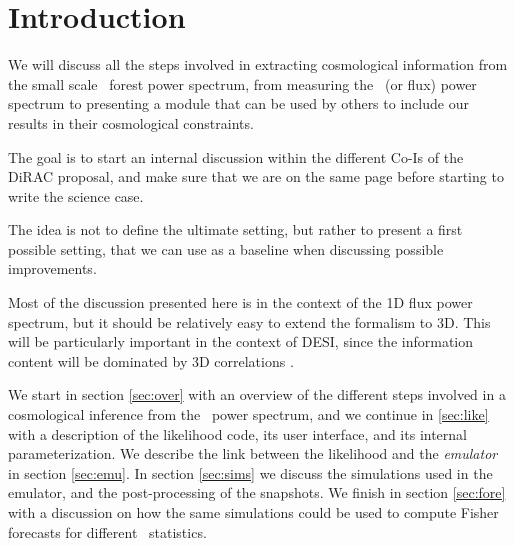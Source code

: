\section{Introduction} 

We will discuss all the steps involved in extracting cosmological information
from the small scale \lya\ forest power spectrum, from measuring the
\lya\ (or flux) power spectrum to presenting a module that can be used
by others to include our results in their cosmological constraints.

The goal is to start an internal discussion within the different Co-Is
of the DiRAC proposal, and make sure that we are on the same page before
starting to write the science case. 

The idea is not to define the ultimate setting, but rather to present a
first possible setting, that we can use as a baseline when discussing
possible improvements.

Most of the discussion presented here is in the context of the 1D flux power
spectrum, but it should be relatively easy to extend the formalism to 3D.
This will be particularly important in the context of DESI, since the
information content will be dominated by 3D correlations 
\cite{Font-Ribera2014,Font-Ribera2018}.

We start in section \ref{sec:over} with an overview of the different steps 
involved in a cosmological inference from the \lya\ power spectrum, and we 
continue in \ref{sec:like} with a description of the likelihood code, 
its user interface, and its internal parameterization. 
We describe the link between the likelihood and the \textit{emulator} in
section \ref{sec:emu}.
In section \ref{sec:sims} we discuss the simulations used in the emulator, 
and the post-processing of the snapshots. 
We finish in section \ref{sec:fore} with a discussion on how the same
simulations could be used to compute Fisher forecasts for different \lya\
statistics.
 
